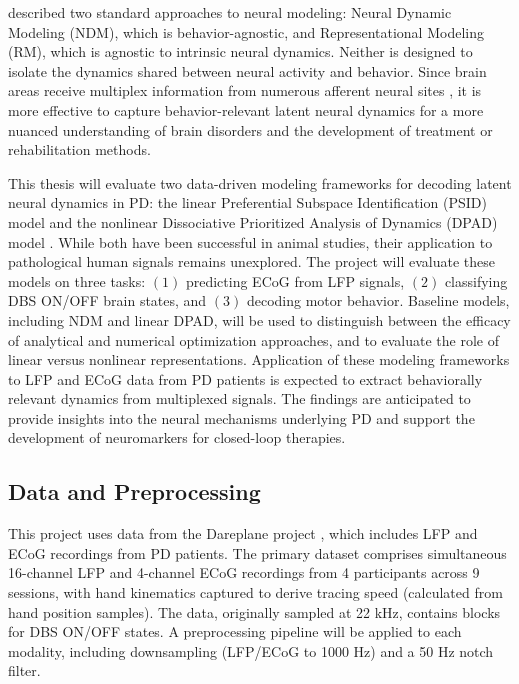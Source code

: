\documentclass[12pt, letterpaper]{article}
\begin{document}
\textcite{saniModelingBehaviorallyRelevant2021} described two standard approaches to neural modeling: Neural Dynamic Modeling (NDM), which is behavior-agnostic, and Representational Modeling (RM), which is agnostic to intrinsic neural dynamics. Neither is designed to isolate the dynamics shared between neural activity and behavior. Since brain areas receive multiplex information from numerous afferent neural sites \parencite{wuMixedSelectivitySubthalamic2025}, it is more effective to capture behavior-relevant latent neural dynamics for a more nuanced understanding of brain disorders and the development of treatment or rehabilitation methods.

This thesis will evaluate two data-driven modeling frameworks for decoding latent neural dynamics in PD: the linear Preferential Subspace Identification (PSID) model \parencite{saniModelingBehaviorallyRelevant2021} and the nonlinear Dissociative Prioritized Analysis of Dynamics (DPAD) model \parencite{saniDissociativePrioritizedModeling2024}. While both have been successful in animal studies, their application to pathological human signals remains unexplored. The project will evaluate these models on three tasks: $(1)$ predicting ECoG from LFP signals, $(2)$ classifying DBS ON/OFF brain states, and $(3)$ decoding motor behavior. Baseline models, including NDM and linear DPAD, will be used to distinguish between the efficacy of analytical and numerical optimization approaches, and to evaluate the role of linear versus nonlinear representations. Application of these modeling frameworks to LFP and ECoG data from PD patients is expected to extract behaviorally relevant dynamics from multiplexed signals. The findings are anticipated to provide insights into the neural mechanisms underlying PD and support the development of neuromarkers for closed-loop therapies.

\subsection{Data and Preprocessing}
This project uses data from the Dareplane project \parencite{doldLFPECoGData2024}, which includes LFP and ECoG recordings from PD patients. The primary dataset comprises simultaneous 16-channel LFP and 4-channel ECoG recordings from 4 participants across 9 sessions, with hand kinematics captured to derive tracing speed (calculated from hand position samples). The data, originally sampled at 22 kHz, contains blocks for DBS ON/OFF states. A preprocessing pipeline will be applied to each modality, including downsampling (LFP/ECoG to 1000 Hz) and a 50 Hz notch filter.
\end{document}
